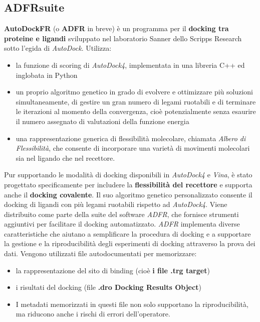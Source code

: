 \subsection{ADFRsuite}
\def\baselinestretch{1.66}
\noindent \textbf{AutoDockFR} (o \textbf{ADFR} in breve) è un programma per il \textbf{docking tra proteine e ligandi} sviluppato nel laboratorio Sanner dello Scripps Research sotto l'egida di \textit{AutoDock}.\newline
Utilizza:
\begin{itemize}
    \item la funzione di scoring di \textit{AutoDock4}, implementata in una libreria C++ ed inglobata in Python
    \item un proprio algoritmo genetico in grado di evolvere e ottimizzare più soluzioni simultaneamente, di gestire un gran numero di legami ruotabili e di terminare le iterazioni al momento della convergenza, cioè potenzialmente senza esaurire il numero assegnato di valutazioni della funzione energia
    \item una rappresentazione generica di flessibilità molecolare, chiamata \textit{Albero di Flessibilità}, che consente di incorporare una varietà di movimenti molecolari sia nel ligando che nel recettore.
\end{itemize}
Pur supportando le modalità di docking disponibili in \textit{AutoDock4} e \textit{Vina}, è stato progettato specificamente per includere la \textbf{flessibilità del recettore} e supporta anche il \textbf{docking covalente}. Il suo algoritmo genetico personalizzato consente il docking di ligandi con più legami ruotabili rispetto ad \textit{AutoDock4}.\newline
Viene distribuito come parte della suite del software \textit{ADFR}, che fornisce strumenti aggiuntivi per facilitare il docking automatizzato.\newline
\textit{ADFR} implementa diverse caratteristiche che aiutano a semplificare la procedura di docking e a supportare la gestione e la riproducibilità degli esperimenti di docking attraverso la prova dei dati. Vengono utilizzati file autodocumentati per memorizzare: 
\begin{itemize}
    \item la rappresentazione del sito di binding (cioè \textbf{i file .trg target})
    \item i risultati del docking (file \textbf{.dro Docking Results Object})
    \item I metadati memorizzati in questi file non solo supportano la riproducibilità, ma riducono anche i rischi di errori dell'operatore.
\end{itemize}
